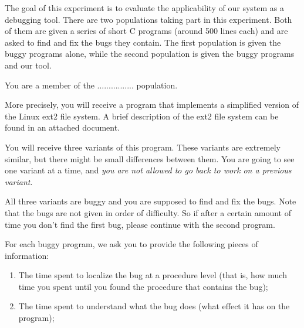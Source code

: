 \documentclass{article}
\title{}
\author{Instructions}
\date{July 30, 2003}
\begin{document}
\maketitle
\begin{flushleft}

\thispagestyle{empty}



\vspace{0.1in}
The goal of this experiment is to evaluate the applicability of our system 
as a debugging tool.  There are two populations taking part in this
experiment.  Both of them are given a series of short C programs (around 500 
lines each) and are asked to find and fix the bugs they contain. The first 
population is given the buggy programs alone, while the second population is 
given the buggy programs and our tool. 

\vspace{0.2in}
You are a member of the ................ population. 

\vspace{0.2in}

More precisely, you will receive a program that implements a simplified version
of the Linux ext2 file system.  A brief description of the ext2 file system can
be found in an attached document. 

\vspace{0.1in}
You will receive three variants of this program.  These variants are extremely
similar, but there might be small differences between them.  You are going
to see one variant at a time, and {\em you are not allowed to go back to work 
on a previous variant}.

\vspace{0.1in}
All three variants are buggy and you are supposed to find and fix the bugs.
Note that the bugs are not given in order of difficulty.  So if after a 
certain amount of time you don't find the first bug, please continue with
the second program.

\vspace{0.1in}
For each buggy program, we ask you to provide the following pieces of 
information:

\begin{enumerate}
\item{The time spent to localize the bug at a procedure level (that is, how 
      much time you spent until you found the procedure that contains the 
      bug);}

\item{The time spent to understand what the bug does (what effect it has on the
      program);}


\end{enumerate}
\end{flushleft}
\end{document}

